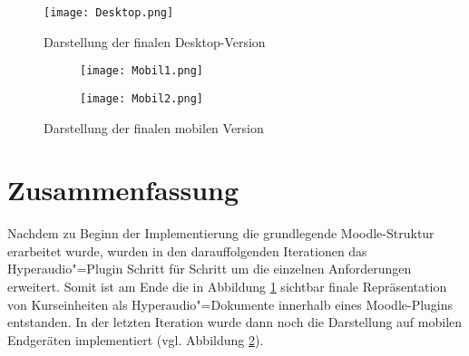 \begin{figure}[h!]
\texttt{[image: Desktop.png]}
\caption{\label{fig:DesktopFinal}Darstellung der finalen Desktop-Version}
\end{figure}

\begin{figure}[h!]
\begin{subfigure}[c]{0.5\textwidth}
\texttt{[image: Mobil1.png]}
\end{subfigure}%
\begin{subfigure}[c]{0.5\textwidth}
\texttt{[image: Mobil2.png]}
\end{subfigure}
\caption{Darstellung der finalen mobilen Version}
\label{fig:MobilFinal}
\end{figure}

\section{Zusammenfassung}
Nachdem zu Beginn der Implementierung die grundlegende Moodle-Struktur erarbeitet wurde, wurden in den darauffolgenden Iterationen das Hyperaudio"=Plugin Schritt für Schritt um die einzelnen Anforderungen erweitert. Somit ist am Ende die in Abbildung \ref{fig:DesktopFinal} sichtbar finale Repräsentation von Kurseinheiten als Hyperaudio"=Dokumente innerhalb eines Moodle-Plugins entstanden. In der letzten Iteration wurde dann noch die Darstellung auf mobilen Endgeräten implementiert (vgl. Abbildung \ref{fig:MobilFinal}).

